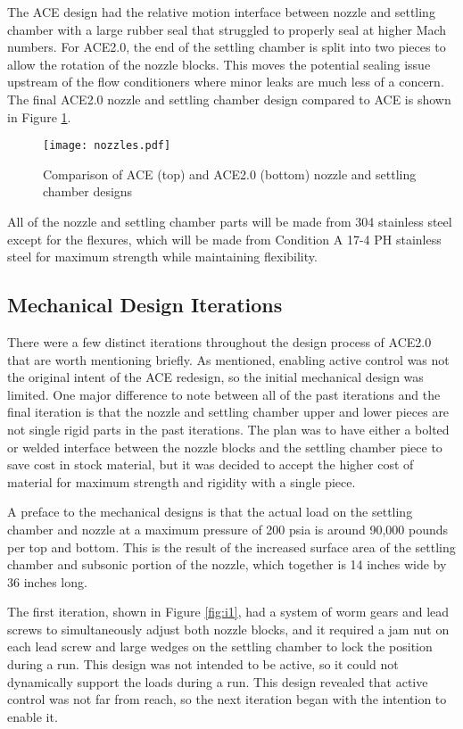 The ACE design had the relative motion interface between nozzle and settling chamber with a large rubber seal that struggled to properly seal at higher Mach numbers. For ACE2.0, the end of the settling chamber is split into two pieces to allow the rotation of the nozzle blocks. This moves the potential sealing issue upstream of the flow conditioners where minor leaks are much less of a concern. The final ACE2.0 nozzle and settling chamber design compared to ACE is shown in Figure \ref{fig:nozzles}. 

\begin{figure}[ht!]
    \centering
    \texttt{[image: nozzles.pdf]}
    \caption{Comparison of ACE (top) and ACE2.0 (bottom) nozzle and settling chamber designs}
    \label{fig:nozzles}
\end{figure}

All of the nozzle and settling chamber parts will be made from 304 stainless steel except for the flexures, which will be made from Condition A 17-4 PH stainless steel for maximum strength while maintaining flexibility.

\subsection{Mechanical Design Iterations}

There were a few distinct iterations throughout the design process of ACE2.0 that are worth mentioning briefly. As mentioned, enabling active control was not the original intent of the ACE redesign, so the initial mechanical design was limited. One major difference to note between all of the past iterations and the final iteration is that the nozzle and settling chamber upper and lower pieces are not single rigid parts in the past iterations. The plan was to have either a bolted or welded interface between the nozzle blocks and the settling chamber piece to save cost in stock material, but it was decided to accept the higher cost of material for maximum strength and rigidity with a single piece.

A preface to the mechanical designs is that the actual load on the settling chamber and nozzle at a maximum pressure of 200 psia is around 90,000 pounds per top and bottom. This is the result of the increased surface area of the settling chamber and subsonic portion of the nozzle, which together is 14 inches wide by 36 inches long.

The first iteration, shown in Figure \ref{fig:i1}, had a system of worm gears and lead screws to simultaneously adjust both nozzle blocks, and it required a jam nut on each lead screw and large wedges on the settling chamber to lock the position during a run. This design was not intended to be active, so it could not dynamically support the loads during a run. This design revealed that active control was not far from reach, so the next iteration began with the intention to enable it.

